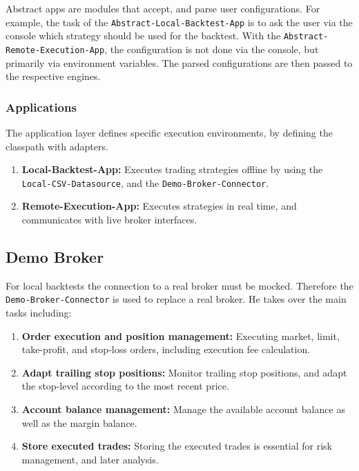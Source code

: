 Abstract apps are modules that accept, and parse user configurations.
For example, the task of the \verb|Abstract-Local-Backtest-App| is to ask the user via the console which strategy should be used for the backtest.
With the \verb|Abstract-Remote-Execution-App|, the configuration is not done via the console, but primarily via environment variables.
The parsed configurations are then passed to the respective engines.

\subsubsection{Applications}

The application layer defines specific execution environments, by defining the classpath with adapters.

\begin{enumerate}
    \item \textbf{Local-Backtest-App:} Executes trading strategies offline by using the \verb|Local-CSV-Datasource|, and the \verb|Demo-Broker-Connector|.
    \item \textbf{Remote-Execution-App:} Executes strategies in real time, and communicates with live broker interfaces.
\end{enumerate}

\subsection{Demo Broker}

For local backtests the connection to a real broker must be mocked.
Therefore the \verb|Demo-Broker-Connector| is used to replace a real broker.
He takes over the main tasks including:

\begin{enumerate}
    \item \textbf{Order execution and position management:} Executing market, limit, take-profit, and stop-loss orders, including execution fee calculation.
    \item \textbf{Adapt trailing stop positions:} Monitor trailing stop positions, and adapt the stop-level according to the most recent price.
    \item \textbf{Account balance management:} Manage the available account balance as well as the margin balance.
    \item \textbf{Store executed trades:} Storing the executed trades is essential for risk management, and later analysis.
\end{enumerate}

